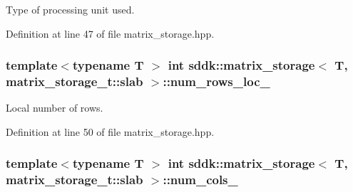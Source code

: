 Type of processing unit used. 



Definition at line 47 of file matrix\+\_\+storage.\+hpp.

\hypertarget{classsddk_1_1matrix__storage_3_01_t_00_01matrix__storage__t_1_1slab_01_4_aed403722d47dae87a9a721b94c8a3ead}{}
\subsubsection[{num\+\_\+rows\+\_\+loc\+\_\+}]{\setlength{\rightskip}{0pt plus 5cm}template$<$typename T $>$ int {\bf sddk\+::matrix\+\_\+storage}$<$ T, matrix\+\_\+storage\+\_\+t\+::slab $>$\+::num\+\_\+rows\+\_\+loc\+\_\+\hspace{0.3cm}{\ttfamily [private]}}\label{classsddk_1_1matrix__storage_3_01_t_00_01matrix__storage__t_1_1slab_01_4_aed403722d47dae87a9a721b94c8a3ead}


Local number of rows. 



Definition at line 50 of file matrix\+\_\+storage.\+hpp.

\hypertarget{classsddk_1_1matrix__storage_3_01_t_00_01matrix__storage__t_1_1slab_01_4_aea07eddfd0f46bb0649933617389a2d1}{}
\subsubsection[{num\+\_\+cols\+\_\+}]{\setlength{\rightskip}{0pt plus 5cm}template$<$typename T $>$ int {\bf sddk\+::matrix\+\_\+storage}$<$ T, matrix\+\_\+storage\+\_\+t\+::slab $>$\+::num\+\_\+cols\+\_\+\hspace{0.3cm}{\ttfamily [private]}}\label{classsddk_1_1matrix__storage_3_01_t_00_01matrix__storage__t_1_1slab_01_4_aea07eddfd0f46bb0649933617389a2d1}


